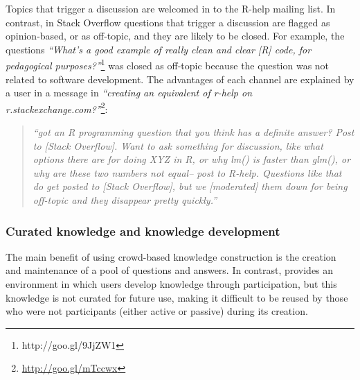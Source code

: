 Topics that trigger a discussion are welcomed in to the R-help mailing list. 
In contrast, in Stack Overflow questions that trigger a discussion are flagged as opinion-based, or as off-topic, and they are likely to be closed. 
For example, the questions \textit{``What's a good example of really clean and clear [R] code, for pedagogical purposes?''}\footnote{http://goo.gl/9JjZW1} was
closed as off-topic because the question was not related to software development. 
The advantages of each channel are explained by a user in a message in \RH \emph{``creating an equivalent of r-help on r.stackexchange.com?''}\footnote{\url{http://goo.gl/mTccwx}}:
    \begin{quote}
        \textit{``got an R programming question that you think has a definite answer? Post to [Stack Overflow]. Want to ask something for discussion, like what options there are for doing XYZ in R, or why lm() is faster than glm(), or why are these two numbers not equal-- post to R-help. Questions like that do get posted to [Stack Overflow], but we [moderated] them down for being off-topic and they disappear pretty quickly.''}
    \end{quote}


\subsubsection{Curated knowledge and knowledge development}

    The main benefit of using crowd-based knowledge construction is the creation and maintenance of a pool of questions and answers. In contrast, \RH provides an environment in which users
    develop knowledge through participation, but this knowledge is not curated for future use, making it difficult to be reused by those who were not
    participants (either active or passive) during its creation.


